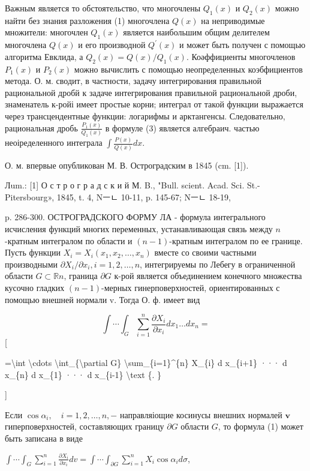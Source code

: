 \documentclass[10pt]{article}
\begin{document}
Важным является то обстоятельство, что многочлены $Q_{1}(x)$ и $Q_{2}(x)$ можно найти без знания разложения (1) многочлена $Q(x)$ на неприводимые множители: многочлен $Q_{1}(x)$ является наибольшим общим делителем многочлена $Q(x)$ и его производной $Q^{\prime}(x)$ и может быть получен с помощью алгоритма Евклида, а $Q_{2}(x)=Q(x) / Q_{1}(x)$. Коәффициенты многочленов $P_{1}(x)$ и $P_{2}(x)$ можно вычислить с помощью неопределенных коэбфициентов метода. О. м. сводит, в частности, задачу интегрирования правильной рациональной дробй к задаче интегрирования правильной рациональной дроби, знаменатель к-ройі имеет простые корни; интеграл от такой функции выражается через трансцендентные функции: логарифмы и арктангенсы. Следовательно, рациональная дробь $\frac{P_{1}(x)}{Q_{1}(x)}$ в формуле (3) является алгебраич. частью неоіределенного интеграла $\int \frac{P(x)}{Q(x)} d x$.



О. м. впервые опубликован М. В. Остроградским в 1845 (cm. [1]).



Лum.: [1] О с т р о г р а д с к и й М. B., "Bull. scient. Acad. Sci. St.-Pitersbourg», 1845, t. 4, Nㅡㄴ 10-11, p. 145-67; Nㅡㄴ 18-19,

p. 286-300. ОСТРОГРАДСКОГО ФОРМУ ЛА - формула интегрального исчисления функций многих переменных, устанавливающая связь между $n$-кратным интегралом по области и $(n-1)$-кратным интегралом по ее границе. Пусть функции $X_{i}=X_{i}\left(x_{1}, x_{2}, \ldots, x_{n}\right)$ вместе со своими частными производными $\partial X_{i} / \partial x_{i}, i=1,2, \ldots, n$, интегрируемы по Лебегу в ограниченной области $G \subset \mathbb{R} n$, граница $\partial G$ к-рой является объединением конечного множества кусочно гладких $(n-1)$-мерных гинерповерхностей, ориентированных с помощью внешней нормали v. Тогда О. ф. имеет вид



\[

\int \cdots \int_{G} \sum_{i=1}^{n} \frac{\partial X_{i}}{\partial x_{i}} d x_{1} \ldots d x_{n}=

\][



=\textbackslash int \textbackslash cdots \textbackslash int\_\{\textbackslash partial G\} \textbackslash sum\_\{i=1\}\^{}\{n\} X\_\{i\} d x\_\{i+1\} ··· d x\_\{n\} d x\_\{1\} ··· d x\_\{i-1\} \textbackslash text \{. \}

]



Если $\cos \alpha_{i}, \quad i=1,2, \ldots, n,-$ направляіощие косинусы внешних нормалей $\boldsymbol{v}$ гиперповерхностей, составляющих границу $\partial G$ области $G$, то формула (1) может быть записана в виде



$\int \cdots \int_{G} \sum_{i=1}^{n} \frac{\partial X_{i}}{\partial x_{i}} d v=\int \cdots \int_{\partial G} \sum_{i=1}^{n} X_{i} \cos \alpha_{i} d \sigma$,
\end{document}
